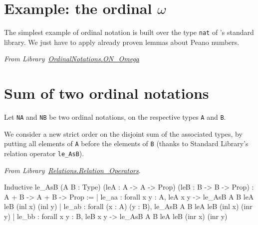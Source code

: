             



\section{Example: the ordinal \texorpdfstring{$\omega$}{omega}}




The simplest example of ordinal notation is built over the type \texttt{nat} of \coq's standard library. We just have to apply already proven lemmas about Peano numbers.

\vspace{4pt}
\noindent\emph{From Library~\href{../theories/html/hydras.OrdinalNotations.ON_Omega.html}{OrdinalNotations.ON\_Omega}}




\section{Sum of  two ordinal notations}

Let \texttt{NA} and \texttt{NB} be two ordinal notations, on the respective types \texttt{A} and \texttt{B}.

 We consider a new strict order
on the disjoint sum of the associated types, by putting all elements of \texttt{A} before the elements of \texttt{B} (thanks to Standard Library's relation operator \texttt{le\_AsB}).

\vspace{4pt}
\noindent
\emph{From Library~\href{https://coq.inria.fr/distrib/current/stdlib/Coq.Relations.Relation_Operators.html}{Relations.Relation\_Operators}}.

\begin{Coqanswer}
Inductive
le_AsB (A B : Type) (leA : A -> A -> Prop) (leB : B -> B -> Prop)
  : A + B -> A + B -> Prop :=
| le_aa : forall x y : A, leA x y -> le_AsB A B leA leB (inl x) (inl y)
| le_ab : forall (x : A) (y : B), le_AsB A B leA leB (inl x) (inr y)
| le_bb : forall x y : B, leB x y -> le_AsB A B leA leB (inr x) (inr y)
\end{Coqanswer}


